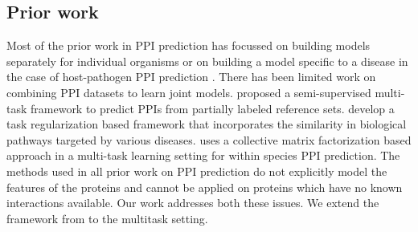 \documentclass[runningheads,a4paper]{llncs}
\begin{document}
\subsection{Prior work}
Most of the prior work in PPI prediction has focussed on building models separately for individual 
organisms \cite{struct2net,qi06} or on building a model specific to a disease in the case of host-pathogen PPI 
prediction \cite{tastan09,dyer07,me12}. There has been limited work on combining PPI datasets to learn joint models. \cite{qi2010} proposed a semi-supervised multi-task framework to predict PPIs from partially labeled reference sets. \cite{me_ismb_2013} develop a task regularization based
framework that incorporates the similarity in biological pathways targeted by various diseases.
\cite{ppi_cmf} uses a collective matrix factorization based approach in a multi-task learning setting for within species PPI prediction. The methods used 
in all prior work on PPI prediction do not explicitly model the features of the proteins and cannot be applied on proteins which have no known interactions available. Our work addresses both these issues.
We extend the framework from \cite{abernethy} to the multitask setting. 
\end{document}
